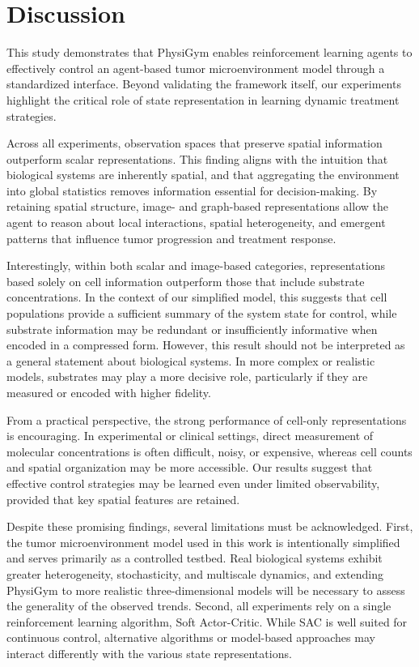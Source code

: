 \documentclass{article}
\begin{document}
\section{Discussion}

This study demonstrates that PhysiGym enables reinforcement learning agents to effectively control an agent-based tumor microenvironment model through a standardized interface. Beyond validating the framework itself, our experiments highlight the critical role of state representation in learning dynamic treatment strategies.

Across all experiments, observation spaces that preserve spatial information outperform scalar representations. This finding aligns with the intuition that biological systems are inherently spatial, and that aggregating the environment into global statistics removes information essential for decision-making. By retaining spatial structure, image- and graph-based representations allow the agent to reason about local interactions, spatial heterogeneity, and emergent patterns that influence tumor progression and treatment response.

Interestingly, within both scalar and image-based categories, representations based solely on cell information outperform those that include substrate concentrations. In the context of our simplified model, this suggests that cell populations provide a sufficient summary of the system state for control, while substrate information may be redundant or insufficiently informative when encoded in a compressed form. However, this result should not be interpreted as a general statement about biological systems. In more complex or realistic models, substrates may play a more decisive role, particularly if they are measured or encoded with higher fidelity.

From a practical perspective, the strong performance of cell-only representations is encouraging. In experimental or clinical settings, direct measurement of molecular concentrations is often difficult, noisy, or expensive, whereas cell counts and spatial organization may be more accessible. Our results suggest that effective control strategies may be learned even under limited observability, provided that key spatial features are retained.

Despite these promising findings, several limitations must be acknowledged. First, the tumor microenvironment model used in this work is intentionally simplified and serves primarily as a controlled testbed. Real biological systems exhibit greater heterogeneity, stochasticity, and multiscale dynamics, and extending PhysiGym to more realistic three-dimensional models will be necessary to assess the generality of the observed trends. Second, all experiments rely on a single reinforcement learning algorithm, Soft Actor-Critic. While SAC is well suited for continuous control, alternative algorithms or model-based approaches may interact differently with the various state representations.
\end{document}
